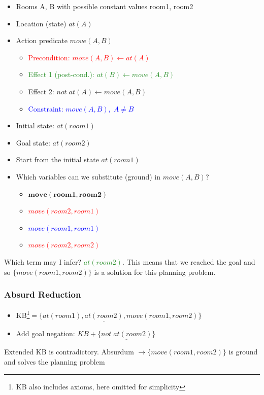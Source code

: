 \begin{minipage}[t]{0.5\textwidth}
    \begin{itemize}
        \item Rooms A, B with possible constant values room1, room2
        \item Location (state) $at(A)$
        \item Action predicate $move(A, B)$
        \begin{itemize}
            \item \textcolor{red}{Precondition: $move(A, B) \leftarrow at(A)$}
            \item \textcolor{ForestGreen}{Effect 1 (post-cond.): $at(B) \leftarrow move(A, B)$}
            \item Effect 2: $not\;at(A) \leftarrow move(A, B)$
            \item \textcolor{blue}{Constraint: $move(A, B),\;A \ne B$}
        \end{itemize}
        \item Initial state: $at(room1)$
        \item Goal state: $at(room2)$
    \end{itemize}
\end{minipage}
\begin{minipage}[t]{0.8\textwidth}
    \begin{itemize}
        \item Start from the initial state $at(room1)$
        \item Which variables can we substitute (ground) in $move(A, B)$?
        \begin{itemize}
            \item $\bm{move(room1, room2)}$
            \item \textcolor{red}{\st{$move(room2, room1)$}}
            \item \textcolor{blue}{\st{$move(room1, room1)$}}
            \item \textcolor{red}{\st{$move(room2, room2)$}}
        \end{itemize}
    \end{itemize}
\end{minipage}
\vspace{0.1cm}

Which term may I infer? \textcolor{ForestGreen}{$at(room2)$}. This means that we reached the goal and so
$\{move(room1,room2)\}$ is a solution for this planning problem.

\subsubsection*{Absurd Reduction}
\begin{itemize}
    \item KB\footnote{KB also includes axioms, here omitted for simplicity}$=\{at(room1), \underline{at(room2)}, move(room1,room2)\}$
    \item Add goal negation: $KB + \{\underline{not\;at(room2)}\}$
\end{itemize}
Extended KB is contradictory.
Absurdum $\rightarrow \{move(room1,room2)\}$ is ground and solves the planning problem

